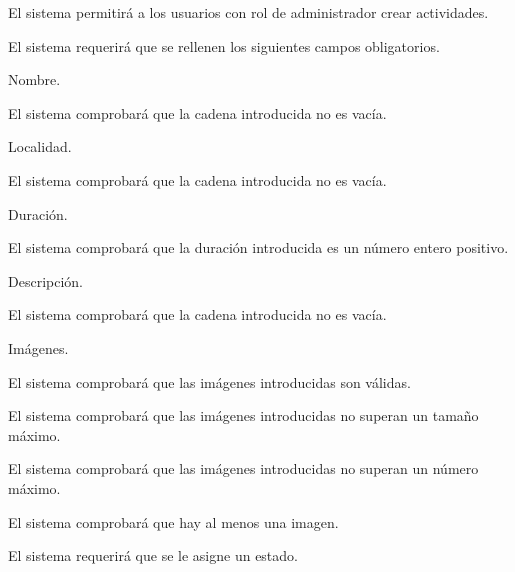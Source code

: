 \begin{enumitem}[label=\bfseries{RAdm \arabic*.},leftmargin=*]
\begin{enumitem}[label*=\bfseries{\arabic*.}]
	\end{enumitem}
	\item El sistema permitirá a los usuarios con rol de administrador crear actividades.
	\begin{enumitem}[label*=\bfseries{\arabic*.}]
		\item El sistema requerirá que se rellenen los siguientes campos obligatorios.
		\begin{enumitem}[label*=\bfseries{\arabic*.}]
			\item Nombre.
			\begin{enumitem}[label*=\bfseries{\arabic*.}]
				\item El sistema comprobará que la cadena introducida no es vacía.
			\end{enumitem}
			\item Localidad.
			\begin{enumitem}[label*=\bfseries{\arabic*.}]
				\item El sistema comprobará que la cadena introducida no es vacía.
			\end{enumitem}
			\item Duración.
			\begin{enumitem}[label*=\bfseries{\arabic*.}]
				\item El sistema comprobará que la duración introducida es un número entero positivo.
			\end{enumitem}
			\item Descripción.
			\begin{enumitem}[label*=\bfseries{\arabic*.}]
				\item El sistema comprobará que la cadena introducida no es vacía.
			\end{enumitem}
			\item Imágenes.
			\begin{enumitem}[label*=\bfseries{\arabic*.}]
				\item El sistema comprobará que las imágenes introducidas son válidas.
				\item El sistema comprobará que las imágenes introducidas no superan un tamaño máximo.
				\item El sistema comprobará que las imágenes introducidas no superan un número máximo.
				\item El sistema comprobará que hay al menos una imagen.
			\end{enumitem}
		\end{enumitem}
		\item El sistema requerirá que se le asigne un estado.

\end{enumitem}
\end{enumitem}
